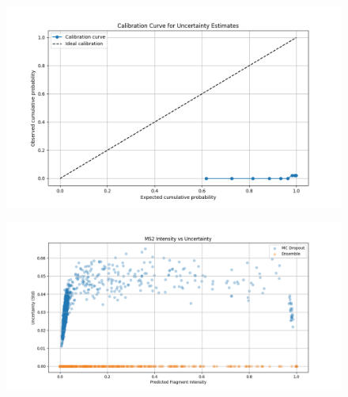 \documentclass[10pt]{article}
\begin{document}
\begin{figure}[htbp]
\vspace{1em}
\begin{minipage}[b]{0.4\textwidth}
    \centering
    \includegraphics[width=\textwidth]{ensemble_calibration.png}
    \label{fig:ensemble_calibration}
\end{minipage}\hfill
\begin{minipage}[b]{0.4\textwidth}
    \centering
    \includegraphics[width=\textwidth]{ms2_intensity_vs_uncertainty.png}
    \label{fig:ms2_intensity}
\end{minipage}


\end{figure}
\end{document}
